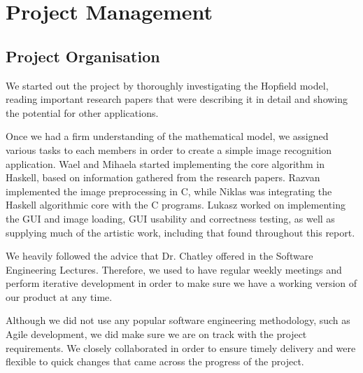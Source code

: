 \chapter{Project Management}




\section{Project Organisation}
We started out the project by thoroughly investigating the Hopfield model, reading important research papers that were describing it in detail and showing the potential for other applications.

Once we had a firm understanding of the mathematical model, we assigned various tasks to each members in order to create a simple image recognition application. Wael and Mihaela started implementing the core algorithm in Haskell, based on information gathered from the research papers. Razvan implemented the image preprocessing in C, while Niklas was integrating the Haskell algorithmic core with the C programs. Lukasz worked on implementing the GUI and image loading, GUI usability and correctness testing, as well as supplying much of the artistic work, including that found throughout this report.

We heavily followed the advice that Dr. Chatley offered in the Software Engineering Lectures. Therefore, we used to have regular weekly meetings and perform iterative development in order to make sure we have a working version of our product at any time.

Although we did not use any popular software engineering methodology, such as Agile development, we did make sure we are on track with the project requirements. We closely collaborated in order to ensure timely delivery and were flexible to quick changes that came across the progress of the project.


